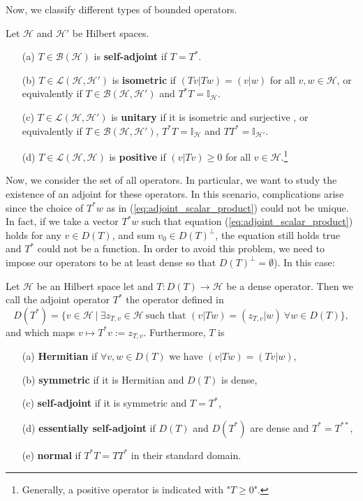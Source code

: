  
 Now, we classify different types of bounded operators.
 \begin{definition}
 	Let $\mathcal{H}$ and $\mathcal{H}'$ be Hilbert spaces.
 	\begin{itemize}
 		\item[(a)] $T\in\mathcal{B}(\mathcal{H})$ is \textbf{self-adjoint} if $T=T^*$.
 		\item[(b)] $T\in\mathcal{L}(\mathcal{H},\mathcal{H}')$ is \textbf{isometric} if $(Tv|Tw)=(v|w)$ for all $v,w\in\mathcal{H}$, or equivalently if $T\in\mathcal{B}(\mathcal{H},\mathcal{H}')$ and $T^*T=\mathbb{I}_{\mathcal{H}}$.
 		\item[(c)] $T\in\mathcal{L}(\mathcal{H},\mathcal{H}')$ is \textbf{unitary} if it is isometric and surjective , or equivalently if $T\in\mathcal{B}(\mathcal{H},\mathcal{H}')$, $T^*T=\mathbb{I}_{\mathcal{H}}$ and $TT^*=\mathbb{I}_{\mathcal{H}'}$.
 		\item[(d)]$T\in\mathcal{L}(\mathcal{H},\mathcal{H})$ is \textbf{positive} if $(v|Tv)\ge0$ for all $v\in\mathcal{H}$.\footnote{Generally, a positive operator is indicated with "$T\ge0$".}
 	\end{itemize}
 \end{definition}
 
Now, we consider the set of all operators. In particular, we want to study the existence of an adjoint for these operators. In this scenario, complications arise since the choice of $T^*w$ as in (\ref{eq:adjoint_scalar_product}) could not be unique. In fact, if we take a vector $T^*w$ such that equation (\ref{eq:adjoint_scalar_product}) holds for any $v\in D(T)$, and sum $v_0\in D(T)^\perp$, the equation still holds true and $T^*$ could not be a function. In order to avoid this problem, we need to impose our operators to be at least dense so that $D(T)^\perp=\emptyset$). In this case:
 
 \begin{definition}
 	Let $\mathcal{H}$ be an Hilbert space let and $T:D(T)\to\mathcal{H}$ be a dense operator. Then we call the adjoint operator $T^*$ the operator defined in
 	\begin{equation}
 		D(T^*)=\{v\in\mathcal{H}\ |\ \exists z_{T,v}\in\mathcal{H} \ \text{such that } (v|Tw)=(z_{T,v}|w)\ \forall w\in D(T)\},
 	\end{equation}
 	and which maps $v\mapsto T^*v:=z_{T,v}$. Furthermore, $T$ is
 	\begin{itemize}
 		\item[(a)] \textbf{Hermitian} if $\forall v,w\in D(T)$ we have $(v|Tw)=(Tv|w)$,
 		\item[(b)] \textbf{symmetric} if it is Hermitian and $D(T)$ is dense,
 		\item[(c)] \textbf{self-adjoint} if it is symmetric and $T=T^*$,
 		\item[(d)] \textbf{essentially self-adjoint} if $D(T)$ and $D(T^*)$ are dense and $T^*=T^{**}$,
 		\item[(e)] \textbf{normal} if $T^*T=TT^*$ in their standard domain.
 	\end{itemize} 
 \end{definition}
 
